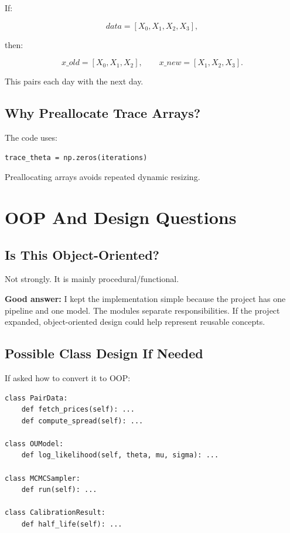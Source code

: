 \documentclass[11pt]{article}
\begin{document}
If:

\[
data = [X_0,X_1,X_2,X_3],
\]

then:

\[
x\_old=[X_0,X_1,X_2],
\qquad
x\_new=[X_1,X_2,X_3].
\]

This pairs each day with the next day.

\subsection{Why Preallocate Trace Arrays?}

The code uses:

\begin{lstlisting}[style=pythonstyle]
trace_theta = np.zeros(iterations)
\end{lstlisting}

Preallocating arrays avoids repeated dynamic resizing.

\section{OOP And Design Questions}

\subsection{Is This Object-Oriented?}

Not strongly. It is mainly procedural/functional.

\textbf{Good answer:} I kept the implementation simple because the project has
one pipeline and one model. The modules separate responsibilities. If the
project expanded, object-oriented design could help represent reusable concepts.

\subsection{Possible Class Design If Needed}

If asked how to convert it to OOP:

\begin{lstlisting}[style=pythonstyle]
class PairData:
    def fetch_prices(self): ...
    def compute_spread(self): ...

class OUModel:
    def log_likelihood(self, theta, mu, sigma): ...

class MCMCSampler:
    def run(self): ...

class CalibrationResult:
    def half_life(self): ...
\end{lstlisting}
\end{document}
